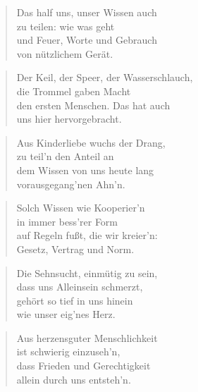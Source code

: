 \documentclass[10pt,a4paper]{article}
\begin{document}
\begin{paracol}{2}
\begin{verse}
Das half uns, unser Wissen auch \\
zu teilen: wie was geht \\
und Feuer, Worte und Gebrauch \\
von nützlichem Gerät. \\
\end{verse}

\begin{verse}
Der Keil, der Speer, der Wasserschlauch, \\
die Trommel gaben Macht \\
den ersten Menschen. Das hat auch \\
uns hier hervorgebracht. \\
\end{verse}

\begin{verse}
Aus Kinderliebe wuchs der Drang, \\
zu teil’n den Anteil an \\
dem Wissen von uns heute lang \\
vorausgegang’nen Ahn’n. \\
\end{verse}

\begin{verse}
Solch Wissen wie Kooperier’n \\
in immer bess’rer Form \\
auf Regeln fußt, die wir kreier’n: \\
Gesetz, Vertrag und Norm. \\
\end{verse}

\begin{verse}
Die Sehnsucht, einmütig zu sein, \\
dass uns Alleinsein schmerzt, \\
gehört so tief in uns hinein \\
wie unser eig’nes Herz. \\
\end{verse}

\begin{verse}
Aus herzensguter Menschlichkeit \\
ist schwierig einzuseh’n, \\
dass Frieden und Gerechtigkeit \\
allein durch uns entsteh’n. \\
\end{verse}


\end{paracol}
\end{document}
